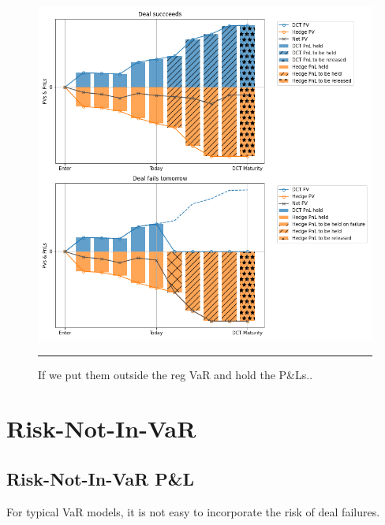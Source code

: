 \documentclass[10pt,a4paper]{article}
\begin{document}
\begin{figure}[h!]
	\begin{center}
		\includegraphics[width=16cm]{figs/dct-illustration-held.png}
	\end{center}
	\caption{
If we put them outside the reg VaR and hold the P\&Ls.. 
	}
	\label{fig:dct-illustration-held}	
	\hrule
\end{figure}

\section{Risk-Not-In-VaR}

\subsection{Risk-Not-In-VaR P\&L}

For typical VaR models, it is not easy to incorporate the risk of deal failures. 
\end{document}
